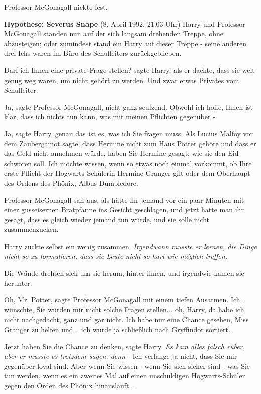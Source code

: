 Professor McGonagall nickte fest.

\textbf{Hypothese: Severus Snape }(8. April 1992, 21:03 Uhr) Harry und Professor
McGonagall standen nun auf der sich langsam drehenden Treppe, ohne abzusteigen;
oder zumindest stand ein Harry auf dieser Treppe - seine anderen drei Ichs waren
im Büro des Schulleiters zurückgeblieben.

\glqq Darf ich Ihnen eine private Frage stellen?\grqq{} sagte Harry, als er
dachte, dass sie weit genug weg waren, um nicht gehört zu werden. \glqq Und zwar
etwas Privates vom Schulleiter.\grqq{}

\glqq Ja\grqq{}, sagte Professor McGonagall, nicht ganz seufzend. \glqq Obwohl
ich hoffe, Ihnen ist klar, dass ich nichts tun kann, was mit meinen Pflichten
gegenüber -\grqq{}

\glqq Ja\grqq{}, sagte Harry, \glqq genau das ist es, was ich Sie fragen muss.
Als Lucius Malfoy vor dem Zaubergamot sagte, dass Hermine nicht zum Haus Potter
gehöre und dass er das Geld nicht annehmen würde, haben Sie Hermine gesagt, wie
sie den Eid schwören soll. Ich möchte wissen, wenn so etwas noch einmal
vorkommt, ob Ihre erste Pflicht der Hogwarts-Schülerin Hermine Granger gilt oder
dem Oberhaupt des Ordens des Phönix, Albus Dumbledore.\grqq{}

Professor McGonagall sah aus, als hätte ihr jemand vor ein paar Minuten mit
einer gusseisernen Bratpfanne ins Gesicht geschlagen, und jetzt hatte man ihr
gesagt, dass es gleich wieder jemand tun würde, und sie solle nicht
zusammenzucken.

Harry zuckte selbst ein wenig zusammen.
\emph{Irgendwann musste er lernen, die Dinge nicht so zu formulieren, dass sie Leute nicht so hart wie möglich treffen.}

Die Wände drehten sich um sie herum, hinter ihnen, und irgendwie kamen sie
herunter.

\glqq Oh, Mr. Potter\grqq{}, sagte Professor McGonagall mit einem tiefen
Ausatmen. \glqq Ich... wünschte, Sie würden mir nicht solche Fragen stellen...
oh, Harry, da habe ich nicht nachgedacht, ganz und gar nicht. Ich habe nur eine
Chance gesehen, Miss Granger zu helfen und... ich wurde ja schließlich nach
Gryffindor sortiert.\grqq{}

\glqq Jetzt haben Sie die Chance zu denken\grqq{}, sagte Harry. \emph{Es kam
alles falsch rüber, aber er musste es trotzdem sagen, denn -} \glqq Ich verlange
ja nicht, dass Sie mir gegenüber loyal sind. Aber wenn Sie wissen - wenn Sie
sich sicher sind - was Sie tun werden, wenn es ein zweites Mal auf einen
unschuldigen Hogwarts-Schüler gegen den Orden des Phönix hinausläuft...\grqq{}

